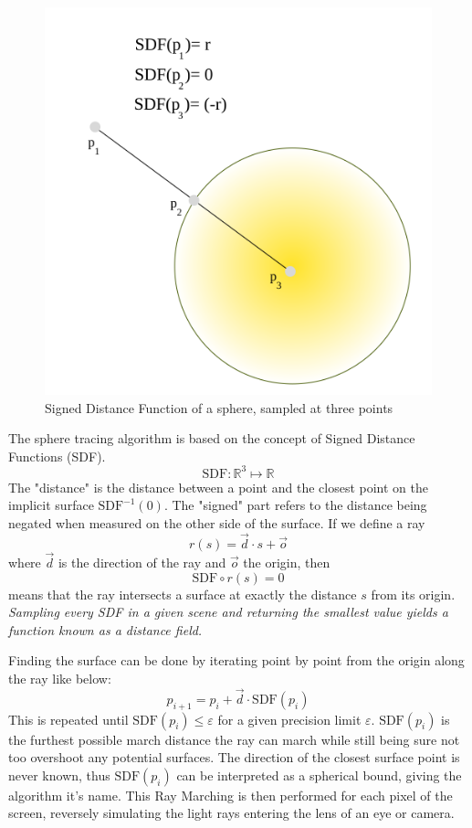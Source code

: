		\begin{figure}
			\begin{flushright}
				\includegraphics[width=0.9\linewidth]{figure/SDF} 
			\end{flushright}
			\caption{ Signed Distance Function of a sphere, sampled at three points}
			\vspace{40pt}
		\end{figure}
		
		The sphere tracing algorithm is based on the concept of Signed Distance Functions (SDF).
		$$\text{SDF}:\mathbb{R}^{3}\mapsto\mathbb{R}$$ 
		The "distance" is the distance between a point and the closest point on the implicit surface $\text{SDF}^{-1}(0)$. 
		The "signed" part refers to the
		distance being negated when measured on the other side of the
		surface. If we define a ray $$r(s) = \vec{d} \cdot s + \vec{o}$$
		where $\vec{d}$ is the direction of the ray and $\vec{o}$ the 
		origin, then $$\text{SDF}\circ r(s) = 0$$ means that the ray
		intersects a surface at exactly the distance $s$ from its origin.
		\emph{ Sampling every SDF in a given scene and returning the smallest 
			value yields a function known as a distance field.
		}

		\bigskip
		\noindent Finding the surface can be done by iterating point by point from the
		origin along the ray like below: $$p_{i+1} = p_i + \vec{d}\cdot
		\text{SDF}(p_i)$$ This is repeated until $\text{SDF}(p_i) \leq
		\varepsilon$ for a given precision limit $\varepsilon$.
		$\text{SDF}(p_i)$ is the furthest possible march distance the ray can 
		march while still being sure not too overshoot any potential surfaces.  
		The direction of the closest surface point is never known, thus 
		$\text{SDF}(p_i)$ can be interpreted as a spherical bound, giving the 
		algorithm it's name. This Ray Marching is then performed for each pixel 
		of the screen, reversely simulating the light rays entering the lens of 
		an eye or camera.
			
